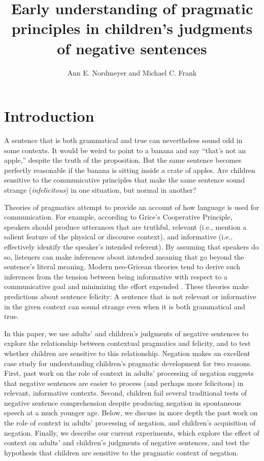 \documentclass[man, noapacite]{apa2}
\title{Early understanding of pragmatic principles in children's judgments of negative sentences}
\author{Ann E. Nordmeyer and Michael C. Frank}
\affiliation{Department of Psychology, Stanford University}
\begin{document}
\maketitle


\section{Introduction}

A sentence that is both grammatical and true can nevertheless sound odd in some contexts. It would be weird to point to a banana and say ``that's not an apple,'' despite the truth of the proposition. But the same sentence becomes perfectly reasonable if the banana is sitting inside a crate of apples. Are children sensitive to the communicative principles that make the same sentence sound strange (\emph{infelicitous}) in one situation, but normal in another?

Theories of pragmatics attempt to provide an account of how language is used for communication. For example, according to Grice's \citeyear{grice1975} Cooperative Principle, speakers should produce utterances that are truthful, relevant (i.e., mention a salient feature of the physical or discourse context), and informative (i.e., effectively identify the speaker's intended referent). By assuming that speakers do so, listeners can make inferences about intended meaning that go beyond the sentence's literal meaning. Modern neo-Gricean theories tend to derive such inferences from the tension between being informative with respect to a communicative goal and minimizing the effort expended \cite{horn1984,levinson2000,frank2012}. These theories make predictions about sentence felicity: A sentence that is not relevant or informative in the given context can sound strange even when it is both grammatical and true.

In this paper, we use adults' and children's judgments of negative sentences to explore the relationship between contextual pragmatics and felicity, and to test whether children are sensitive to this relationship. Negation makes an excellent case study for understanding children's pragmatic development for two reasons. First, past work on the role of context in adults' processing of negation suggests that negative sentences are easier to process (and perhaps more felicitous) in relevant, informative contexts. Second, children fail several traditional tests of negative sentence comprehension despite producing negation in spontaneous speech at a much younger age. Below, we discuss in more depth the past work on the role of context in adults' processing of negation, and children's acquisition of negation. Finally, we describe our current experiments, which explore the effect of context on adults' and children's judgments of negative sentences, and test the hypothesis that children are sensitive to the pragmatic context of negation.
\end{document}
